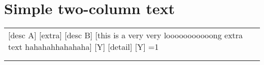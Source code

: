 \documentclass{article}
\makeatletter
\gdef\bidGroupFillSpec{GroupBGOne}
\newlength{\bidLeftWidth}\setlength{\bidLeftWidth}{.66\linewidth}
\newlength{\bidRightWidth}\setlength{\bidRightWidth}{.66\linewidth}
\newcommand{\BidRowStretch}{0.5}
\newcounter{bidNeed}
\gdef\bidLabel{}\gdef\bidDesc{}
\gdef\bidLabel{#1}\setcounter{bidNeed}{1}%
\newenvironment{bidsemi}{%
  \begingroup
  \par\ttfamily\parskip=0pt\parindent=0pt%
  \setcounter{bidNeed}{0}\gdef\bidLabel{}\gdef\bidDesc{}%
  \renewcommand{\arraystretch}{\BidRowStretch}%
  \begin{tabular}{@{}p{\bidLeftWidth}@{\hspace{0.0em}}p{\bidRightWidth}@{}}%
}{%
  \ifnum\value{bidNeed}=1\relax
    \ifx\bidDesc\empty
      {\cellcolor{\bidGroupFillSpec}{\color{bidLabelColor}\texttt{\bfseries \bidLabel}}} & {\cellcolor{\bidGroupFillSpec}}\\
    \else
      {\cellcolor{\bidGroupFillSpec}{\color{bidLabelColor}\texttt{\bfseries \bidLabel :}}{\texttt{\color{bidDescColor} \bidDesc}}} & {\cellcolor{\bidGroupFillSpec}}\\
    \fi
  \fi
  \end{tabular}\par\endgroup%
}
\makeatother
\begin{document}
\section*{Simple two-column text}
\begin{bidsemi}
\bid{A}[desc A]
\subbid{A1}
\subbid{A2}[extra]
\subbid{A3}
\bid{B}[desc B]
\subbid{B1}[this is a very very looooooooooong extra text hahahahhahahaha]
\subsubbid{X}[Y]
\subbid{B2}
\bid{C}
\subbid{C1}
\subbid{C2}[detail]
\subsubbid{X}[Y]
\bid{D}
\flushbid
\bid{E}
\subbid{E1}
\end{bidsemi}
\end{document}
